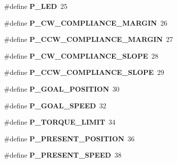 \begin{DoxyCompactItemize}
\#define {\bfseries P\+\_\+\+L\+ED}~25
\item 
\mbox{\label{Driver-EV3_2CCAx12Adc_8hpp_a132467237fdf52965f65576e558e9c9f}} 
\#define {\bfseries P\+\_\+\+C\+W\+\_\+\+C\+O\+M\+P\+L\+I\+A\+N\+C\+E\+\_\+\+M\+A\+R\+G\+IN}~26
\item 
\mbox{\label{Driver-EV3_2CCAx12Adc_8hpp_a96e0f467f0bd47aa1139781962c251b0}} 
\#define {\bfseries P\+\_\+\+C\+C\+W\+\_\+\+C\+O\+M\+P\+L\+I\+A\+N\+C\+E\+\_\+\+M\+A\+R\+G\+IN}~27
\item 
\mbox{\label{Driver-EV3_2CCAx12Adc_8hpp_aa3c4f1f33ef774cab9af68d1eafa5037}} 
\#define {\bfseries P\+\_\+\+C\+W\+\_\+\+C\+O\+M\+P\+L\+I\+A\+N\+C\+E\+\_\+\+S\+L\+O\+PE}~28
\item 
\mbox{\label{Driver-EV3_2CCAx12Adc_8hpp_ac723a13db94280ea187027f6605b07ca}} 
\#define {\bfseries P\+\_\+\+C\+C\+W\+\_\+\+C\+O\+M\+P\+L\+I\+A\+N\+C\+E\+\_\+\+S\+L\+O\+PE}~29
\item 
\mbox{\label{Driver-EV3_2CCAx12Adc_8hpp_a262fb90b6c0853b6187e2743a7b37094}} 
\#define {\bfseries P\+\_\+\+G\+O\+A\+L\+\_\+\+P\+O\+S\+I\+T\+I\+ON}~30
\item 
\mbox{\label{Driver-EV3_2CCAx12Adc_8hpp_a094032aec29139fd73d7018ffe2043f4}} 
\#define {\bfseries P\+\_\+\+G\+O\+A\+L\+\_\+\+S\+P\+E\+ED}~32
\item 
\mbox{\label{Driver-EV3_2CCAx12Adc_8hpp_ae56a723cb417bb70b1855a207e314215}} 
\#define {\bfseries P\+\_\+\+T\+O\+R\+Q\+U\+E\+\_\+\+L\+I\+M\+IT}~34
\item 
\mbox{\label{Driver-EV3_2CCAx12Adc_8hpp_abcad901941fd2d417d60115ed1a3d55d}} 
\#define {\bfseries P\+\_\+\+P\+R\+E\+S\+E\+N\+T\+\_\+\+P\+O\+S\+I\+T\+I\+ON}~36
\item 
\mbox{\label{Driver-EV3_2CCAx12Adc_8hpp_ac72fc9a76224e1c10adcbc2d159f1ce6}} 
\#define {\bfseries P\+\_\+\+P\+R\+E\+S\+E\+N\+T\+\_\+\+S\+P\+E\+ED}~38
\item 

\end{DoxyCompactItemize}
